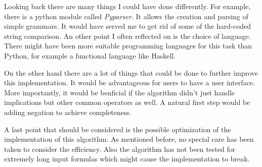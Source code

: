 Looking back there are many things I could have done differently. For example, there is a python module called \emph{Pyparser}\cite{pypar}. It allows the creation and parsing of simple grammars. It would have served me to get rid of some of the hard-coded string comparison. An other point I often reflected on is the choice of language. There might have been more suitable programming languages for this task than Python, for example a functional language like Haskell. 

On the other hand there are a lot of things that could be done to further improve this implementation. It would be advantageous for users to have a user interface. More importantly, it would be benficial if the algorithm didn't just handle implications but other common operators as well. A natural first step would be adding negation to achieve completeness.

A last point that should be considered is the possible optimization of the implementation of this algorithm. As mentioned before, no special care has been taken to consider the efficiency. Also the algorithm has not been tested for extremely long input formulas which might cause the implementation to break. 